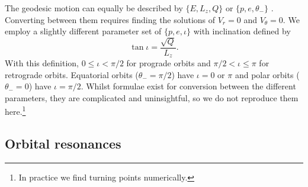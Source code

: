 The geodesic motion can equally be described by $\{E,L_z,Q\}$ or $\{p,e,\theta_-\}$ \citep{Schmidt2002}. Converting between them requires finding the solutions of $V_r = 0$ and $V_\theta = 0$. We employ a slightly different parameter set of $\{p,e,\iota\}$ with inclination defined by \citep{Ryan1996,Glampedakis2002}
\begin{equation}
\tan \iota = \dfrac{\sqrt{Q}}{L_z}.
\end{equation}
With this definition, $0 \leq \iota < \pi/2$ for prograde orbits and $\pi/2 < \iota \leq \pi$ for retrograde orbits. Equatorial orbits ($\theta_- = \pi/2$) have $\iota = 0$ or $\pi$ and polar orbits ($\theta_- = 0$) have $\iota = \pi/2$. Whilst formulae exist for conversion between the different parameters, they are complicated and uninsightful, so we do not reproduce them here.\footnote{In practice we find turning points numerically.}

\subsection{Orbital resonances}

